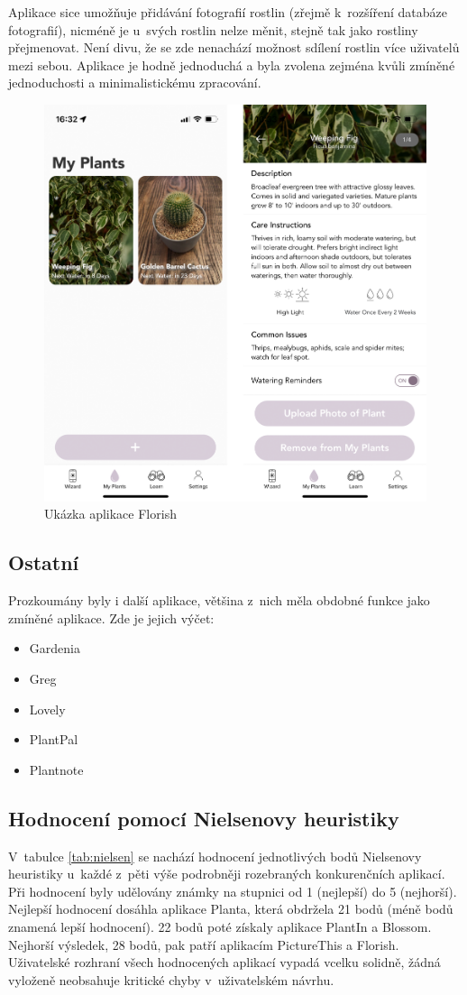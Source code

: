 \documentclass[thesis=M,czech]{FITthesis}[2019/12/23]
\begin{document}
    Aplikace sice umožňuje přidávání fotografií rostlin (zřejmě k~rozšíření databáze fotografií), nicméně je u~svých rostlin nelze měnit, stejně tak jako rostliny přejmenovat. Není divu, že se zde nenachází možnost sdílení rostlin více uživatelů mezi sebou. Aplikace je hodně jednoduchá a byla zvolena zejména kvůli zmíněné jednoduchosti a minimalistickému zpracování.
    \newpage
    \begin{figure}[H]
    	\centering
    	\includegraphics[width=0.75\linewidth]{images/florish.png}
      	\caption{Ukázka aplikace Florish}
      	\label{img:florish}
    \end{figure}
    
\subsection{Ostatní}
    Prozkoumány byly i další aplikace, většina z~nich měla obdobné funkce jako zmíněné aplikace. Zde je jejich výčet:
    \begin{itemize}
        \item Gardenia
        \item Greg
        \item Lovely
        \item PlantPal
        \item Plantnote
    \end{itemize}
    
\subsection{Hodnocení pomocí Nielsenovy heuristiky}
V~tabulce \ref{tab:nielsen} se nachází hodnocení jednotlivých bodů Nielsenovy heuristiky u~každé z~pěti výše podrobněji rozebraných konkurenčních aplikací. Při hodnocení byly udělovány známky na stupnici od 1 (nejlepší) do 5 (nejhorší). Nejlepší hodnocení dosáhla aplikace Planta, která obdržela 21 bodů (méně bodů znamená lepší hodnocení). 22 bodů poté získaly aplikace PlantIn a Blossom. Nejhorší výsledek, 28 bodů, pak patří aplikacím PictureThis a Florish. Uživatelské rozhraní všech hodnocených aplikací vypadá vcelku solidně, žádná vyloženě neobsahuje kritické chyby v~uživatelském návrhu.
\end{document}
